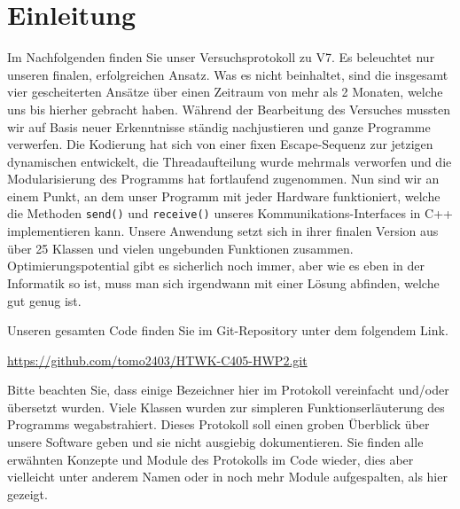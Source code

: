 \chapter{Einleitung}
Im Nachfolgenden finden Sie unser Versuchsprotokoll zu V7. Es beleuchtet nur unseren finalen, erfolgreichen Ansatz. Was es nicht beinhaltet, sind die insgesamt vier gescheiterten Ansätze über einen Zeitraum von mehr als 2 Monaten, welche uns bis hierher gebracht haben. Während der Bearbeitung des Versuches mussten wir auf Basis neuer Erkenntnisse ständig nachjustieren und ganze Programme verwerfen. Die Kodierung hat sich von einer fixen Escape-Sequenz zur jetzigen dynamischen entwickelt, die Threadaufteilung wurde mehrmals verworfen und die Modularisierung des Programms hat fortlaufend zugenommen. Nun sind wir an einem Punkt, an dem unser Programm mit jeder Hardware funktioniert, welche die Methoden \texttt{send()} und \texttt{receive()} unseres Kommunikations-Interfaces in C++ implementieren kann. Unsere Anwendung setzt sich in ihrer finalen Version aus über 25 Klassen und vielen ungebunden Funktionen zusammen. Optimierungspotential gibt es sicherlich noch immer, aber wie es eben in der Informatik so ist, muss man sich irgendwann mit einer Lösung abfinden, welche gut genug ist.

\vspace{0.5cm}
\noindent
Unseren gesamten Code finden Sie im Git-Repository unter dem folgendem Link.
\begin{tcolorbox}[colback=gray!10,colframe=black,boxrule=0.5pt]
\href{https://github.com/tomo2403/HTWK-C405-HWP2.git}{https://github.com/tomo2403/HTWK-C405-HWP2.git}
\end{tcolorbox}
\vspace{0.5cm}

\noindent
Bitte beachten Sie, dass einige Bezeichner hier im Protokoll vereinfacht und/oder übersetzt wurden. Viele Klassen wurden zur simpleren Funktionserläuterung des Programms wegabstrahiert. Dieses Protokoll soll einen groben Überblick über unsere Software geben und sie nicht ausgiebig dokumentieren. Sie finden alle erwähnten Konzepte und Module des Protokolls im Code wieder, dies aber vielleicht unter anderem Namen oder in noch mehr Module aufgespalten, als hier gezeigt.